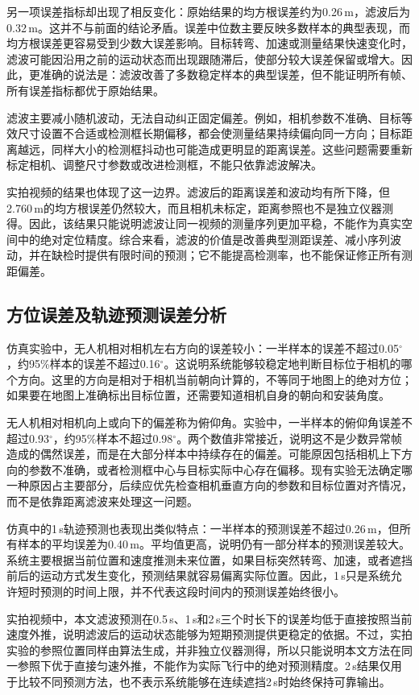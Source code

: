 另一项误差指标却出现了相反变化：原始结果的均方根误差约为0.26\,m，滤波后为0.32\,m。这并不与前面的结论矛盾。误差中位数主要反映多数样本的典型表现，而均方根误差更容易受到少数大误差影响。目标转弯、加速或测量结果快速变化时，滤波可能因沿用之前的运动状态而出现跟随滞后，使部分较大误差保留或增大。因此，更准确的说法是：滤波改善了多数稳定样本的典型误差，但不能证明所有帧、所有误差指标都优于原始结果。

滤波主要减小随机波动，无法自动纠正固定偏差。例如，相机参数不准确、目标等效尺寸设置不合适或检测框长期偏移，都会使测量结果持续偏向同一方向；目标距离越远，同样大小的检测框抖动也可能造成更明显的距离误差。这些问题需要重新标定相机、调整尺寸参数或改进检测框，不能只依靠滤波解决。

实拍视频的结果也体现了这一边界。滤波后的距离误差和波动均有所下降，但2.760\,m的均方根误差仍然较大，而且相机未标定，距离参照也不是独立仪器测得。因此，该结果只能说明滤波让同一视频的测量序列更加平稳，不能作为真实空间中的绝对定位精度。综合来看，滤波的价值是改善典型测距误差、减小序列波动，并在缺检时提供有限时间的预测；它不能提高检测率，也不能保证修正所有测距偏差。

\subsection{方位误差及轨迹预测误差分析}

仿真实验中，无人机相对相机左右方向的误差较小：一半样本的误差不超过0.05$^{\circ}$，约95\%样本的误差不超过0.16$^{\circ}$。这说明系统能够较稳定地判断目标位于相机的哪个方向。这里的方向是相对于相机当前朝向计算的，不等同于地图上的绝对方位；如果要在地图上准确标出目标位置，还需要知道相机自身的朝向和安装角度。

无人机相对相机向上或向下的偏差称为俯仰角。实验中，一半样本的俯仰角误差不超过0.93$^{\circ}$，约95\%样本不超过0.98$^{\circ}$。两个数值非常接近，说明这不是少数异常帧造成的偶然误差，而是在大部分样本中持续存在的偏差。可能原因包括相机上下方向的参数不准确，或者检测框中心与目标实际中心存在偏移。现有实验无法确定哪一种原因占主要部分，后续应优先检查相机垂直方向的参数和目标位置对齐情况，而不是依靠距离滤波来处理这一问题。

仿真中的1\,s轨迹预测也表现出类似特点：一半样本的预测误差不超过0.26\,m，但所有样本的平均误差为0.40\,m。平均值更高，说明仍有一部分样本的预测误差较大。系统主要根据当前位置和速度推测未来位置，如果目标突然转弯、加速，或者遮挡前后的运动方式发生变化，预测结果就容易偏离实际位置。因此，1\,s只是系统允许短时预测的时间上限，并不代表这段时间内的预测误差始终很小。

实拍视频中，本文滤波预测在0.5\,s、1\,s和2\,s三个时长下的误差均低于直接按照当前速度外推，说明滤波后的运动状态能够为短期预测提供更稳定的依据。不过，实拍实验的参照位置同样由算法生成，并非独立仪器测得，所以只能说明本文方法在同一参照下优于直接匀速外推，不能作为实际飞行中的绝对预测精度。2\,s结果仅用于比较不同预测方法，也不表示系统能够在连续遮挡2\,s时始终保持可靠输出。

